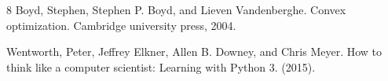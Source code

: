\documentclass{book}
\newcounter{savedenum}
\newcommand*{\saveenum}{\setcounter{savedenum}{\theenumi}}
\newcommand*{\resume}{\setcounter{enumi}{\thesavedenum}}
\begin{document}
%
%
%
%	
%
%
%
%
%
%


\begin{thebibliography}{8}
Boyd, Stephen, Stephen P. Boyd, and Lieven Vandenberghe. Convex optimization. Cambridge university press, 2004.

Wentworth, Peter, Jeffrey Elkner, Allen B. Downey, and Chris Meyer. How to think like a computer scientist: Learning with Python 3. (2015).

\end{thebibliography}
\end{document}
